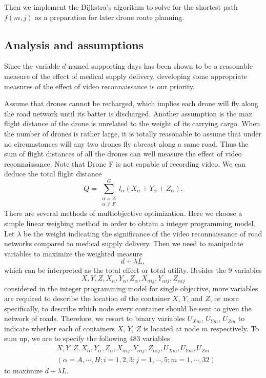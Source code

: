 \documentclass{mcmthesis}
\begin{document}
Then we implement the Dijkstra's algorithm to solve for the shortest path $f(m,j)$ as a preparation for later drone route planning. 

\subsection{Analysis and assumptions}
 Since the variable $d$ named supporting days has been shown to be a reasonable measure of the effect of medical supply delivery, developing some appropriate measures of the effect of video reconnaissance is our priority.

\noindent Assume that drones cannot be recharged, which implies each drone will fly along the road network until its batter is discharged. Another assumption is the max flight distance of the drone is unrelated to the weight of its carrying cargo. When the number of drones is rather large, it is totally reasonable to assume that under no circumstances will any two drones fly abreast along a same road. Thus the sum of flight distances of all the drones can well measure the effect of video reconnaissance. Note that Drone F is not capable of recording video. We can deduce the total flight distance
\[
Q=\sum_{\substack{\alpha=A\\ \alpha\ne F}}^{G}l_\alpha (X_\alpha+Y_\alpha+Z_\alpha).
\]
There are several methods of multiobjective optimization. Here we choose a simple linear weighing method in order to obtain a integer programming model. Let $\lambda$ be the weight indicating the significance of the video reconnaissance of road networks compared to medical supply delivery. Then we need to manipulate variables to maximize the weighted measure
\[
d+\lambda L,
\] 
which can be interpreted as the total effect or total utility. 
Besides the 9 variables
\[
X,Y,Z,X_{\alpha},Y_{\alpha},Z_{\alpha},X_{\alpha ij},Y_{\alpha ij},Z_{\alpha ij}
\]
considered in the integer programming model for single objective, more variables are required to describe the location of the container $X$, $Y$, and $Z$, or more specifically, to describe which node  every container should be sent to given the network of roads. Therefore, we resort to binary variables $U_{Xm}$, $U_{Ym}$, $U_{Zm}$ to indicate whether each of containers $X$, $Y$, $Z$ is located at node $m$ respectively. To sum up, we are to specify the following 483 variables
\begin{align*}
	&X,Y,Z,X_{\alpha},Y_{\alpha},Z_{\alpha},X_{\alpha ij},Y_{\alpha ij},Z_{\alpha ij},U_{Xm},U_{Ym},U_{Zm}\\
	&(\alpha=A,\cdots,H;i=1,2,3;j=1,\cdots,5;m=1,\cdots,32)
\end{align*}
to maximize $d+\lambda L$.
\end{document}
